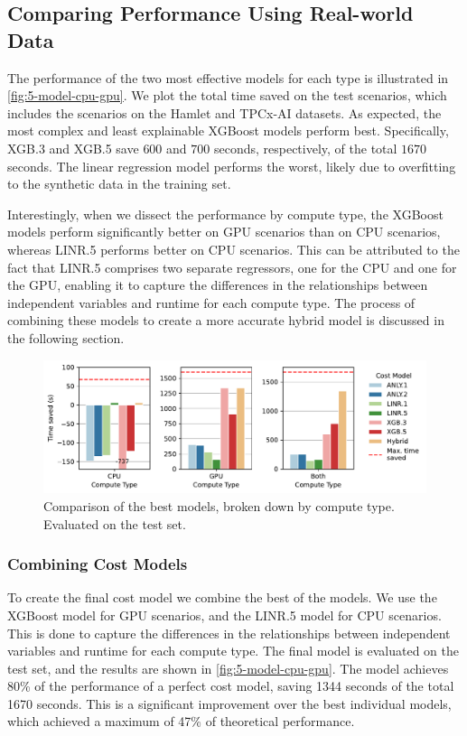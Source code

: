 \subsection{Comparing Performance Using Real-world Data}
\label{subsec:5-comparing-performance}
The performance of the two most effective models for each type is illustrated in \autoref{fig:5-model-cpu-gpu}. We plot the total time saved on the test scenarios, which includes the scenarios on the Hamlet and TPCx-AI datasets. As expected, the most complex and least explainable XGBoost models perform best. Specifically, XGB.3 and XGB.5 save $600$ and $700$ seconds, respectively, of the total $1670$ seconds. The linear regression model performs the worst, likely due to overfitting to the synthetic data in the training set.

Interestingly, when we dissect the performance by compute type, the XGBoost models perform significantly better on GPU scenarios than on CPU scenarios, whereas LINR.5 performs better on CPU scenarios. This can be attributed to the fact that LINR.5 comprises two separate regressors, one for the CPU and one for the GPU, enabling it to capture the differences in the relationships between independent variables and runtime for each compute type. The process of combining these models to create a more accurate hybrid model is discussed in the following section.

\begin{figure}[ht]
  \centering
  \includegraphics[width=0.9\linewidth]{chapters/05_cost_estimation/figures/compare_gpu_vs_cpu.pdf}
  \caption[Cost Model Comparison Broken Down by Compute Type]{Comparison of the best models, broken down by compute type. Evaluated on the test set.}
  \label{fig:5-model-cpu-gpu}
\end{figure}

\subsubsection{Combining Cost Models}
\label{subsec:5-hybrid}
To create the final cost model we combine the best of the models. We use the XGBoost model for GPU scenarios, and the LINR.5 model for CPU scenarios. This is done to capture the differences in the relationships between independent variables and runtime for each compute type. The final model is evaluated on the test set, and the results are shown in \autoref{fig:5-model-cpu-gpu}. The model achieves 80\% of the performance of a perfect cost model, saving 1344 seconds of the total 1670 seconds. This is a significant improvement over the best individual models, which achieved a maximum of 47\% of theoretical performance.


